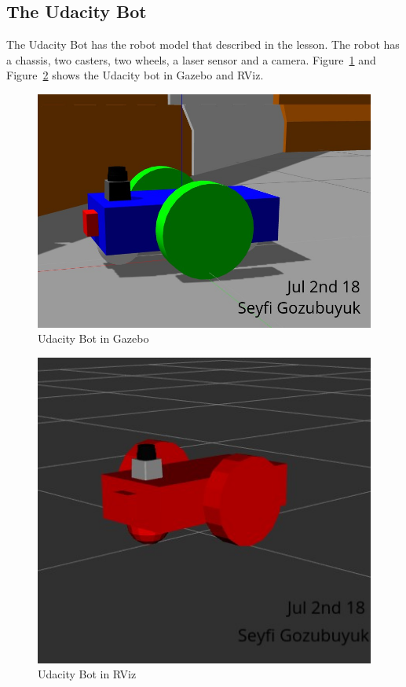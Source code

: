 \documentclass[10pt,journal,compsoc]{IEEEtran}
\begin{document}
\subsection{The Udacity Bot}
The Udacity Bot has the robot model that described in the lesson. The robot has a chassis, two casters, two wheels, a laser sensor and a camera. Figure~\ref{fig:ubotgaz} and Figure~\ref{fig:ubotrvz} shows the Udacity bot in Gazebo and RViz.

\begin{figure}[thpb]
      \centering
      \includegraphics[width=\linewidth]{figures/UdacityBotGazebo.png}
      \caption{Udacity Bot in Gazebo}
      \label{fig:ubotgaz}
\end{figure}

\begin{figure}[thpb]
      \centering
      \includegraphics[width=\linewidth]{figures/UdacityBotRViz.png}
      \caption{Udacity Bot in RViz}
      \label{fig:ubotrvz}
\end{figure}
\end{document}
